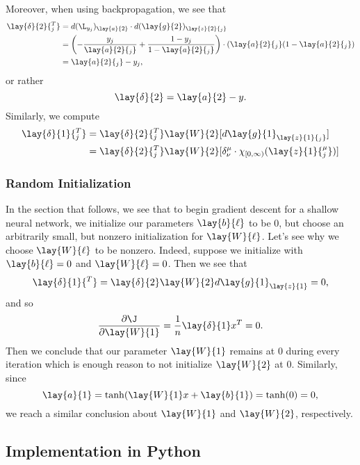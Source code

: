 Moreover, when using backpropagation, we see that
\begin{align*}
	\lay{\delta}{2}{^T_j}&=d(\L_{y_j})_{\lay{a}{2}}\cdot d(\lay{g}{2})_{\lay{z}{2}{_j}}\\
	&=\left(-\frac{y_j}{\lay{a}{2}{_j}}+\frac{1-y_j}{1-\lay{a}{2}{_j}}\right)\cdot(\lay{a}{2}{_j}(1-\lay{a}{2}{_j})\\
	&=\lay{a}{2}{_j}-y_j,
\end{align*}
or rather
$$\lay{\delta}{2}=\lay{a}{2}-y.$$
Similarly, we compute
\begin{align*}
	\lay{\delta}{1}{_j^T}&=\lay{\delta}{2}{_j^T}\lay{W}{2}[d\lay{g}{1}_{\lay{z}{1}{_j}}]\\
	&=\lay{\delta}{2}{_j^T}\lay{W}{2}[\delta^\mu_\nu\cdot\chi_{[0,\infty)}(\lay{z}{1}{^\mu_j})]
\end{align*}


\subsubsection{Random Initialization}
In the section that follows, we see that to begin gradient descent for a shallow neural network, we initialize our parameters $\lay{b}{\ell}$ to be $0$, but choose an arbitrarily small, but nonzero initialization for $\lay{W}{\ell}$.  Let's see why we choose $\lay{W}{\ell}$ to be nonzero.  Indeed, suppose we initialize with $\lay{b}{\ell}=0$ and $\lay{W}{\ell}=0$.  Then we see that
$$\lay{\delta}{1}{^T}=\lay{\delta}{2}\lay{W}{2}d\lay{g}{1}_{\lay{z}{1}}=0,$$
and so
$$\frac{\partial\J}{\partial\lay{W}{1}}=\frac{1}{n}\lay{\delta}{1}x^T=0.$$
Then we conclude that our parameter $\lay{W}{1}$ remains at $0$ during every iteration which is enough reason to not initialize $\lay{W}{2}$ at $0$.  Similarly, since
$$\lay{a}{1}=\tanh(\lay{W}{1}x+\lay{b}{1})=\tanh(0)=0,$$
we reach a similar conclusion about $\lay{W}{1}$ and $\lay{W}{2}$, respectively.

\subsection{Implementation in Python}


